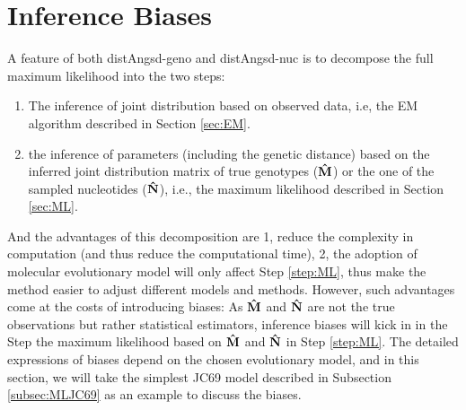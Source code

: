 \documentclass{article}
\begin{document}

\section{Inference Biases}\label{sec:Bias}
A feature of both distAngsd-geno and distAngsd-nuc is to decompose the full maximum likelihood into the two steps: 
\begin{enumerate}
    \item The inference of joint distribution based on observed data, i.e, the EM algorithm described in Section \ref{sec:EM}. \label{step:EM}
    \item the inference of parameters (including the genetic distance) based on the inferred joint distribution matrix of true genotypes ($\bf \hat{M}$) or the one of the sampled nucleotides ($\bf \hat{N}$), i.e., the maximum likelihood described in Section \ref{sec:ML}. \label{step:ML}
\end{enumerate}
And the advantages of this decomposition are 1, reduce the complexity in computation (and thus reduce the computational time), 2,  the adoption of molecular evolutionary model will only affect Step \ref{step:ML}, thus make the method easier to adjust different models and methods. However, such advantages come at the costs of introducing biases: As $\bf \hat{M}$ and $\bf \hat{N}$ are not the true observations but rather statistical estimators, inference biases will kick in in the Step the maximum likelihood based on $\bf \hat{M}$ and $\bf \hat{N}$ in Step \ref{step:ML}. The detailed expressions of biases depend on the chosen evolutionary model, and in this section, we will take the simplest JC69 model described in Subsection \ref{subsec:MLJC69} as an example to discuss the biases.
\end{document}
